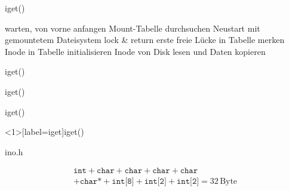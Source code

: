 \documentclass{beamer}
\begin{document}
\begin{frame}{iget()}
    \begin{algorithmic}[1]
                    \State warten, von vorne anfangen
                \EndIf
                    \State Mount-Tabelle durchsuchen
                    \State Neustart mit gemountetem Dateisystem
                \EndIf
                \State lock \& return
            \EndIf
            \State erste freie Lücke in Tabelle merken
        \EndFor
        \State Inode in Tabelle initialisieren
        \State Inode von Disk lesen und Daten kopieren
    \end{algorithmic}
\end{frame}

\begin{frame}{iget()}
\end{frame}

\begin{frame}{iget()}
\end{frame}

\begin{frame}{iget()}
\end{frame}

\begin{frame}<1>[label=iget]{iget()}
\end{frame}


\begin{frame}{ino.h}
    
    \begin{multline*}
        \texttt{int}
        +
        \texttt{char}
        +
        \texttt{char}
        +
        \texttt{char}
        +
        \texttt{char}
        \\
        +
        \texttt{char*}
        +
        \texttt{int[8]}
        +
        \texttt{int[2]}
        +
        \texttt{int[2]}
        = 32\,\text{Byte}
    \end{multline*}
\end{frame}



\end{document}

